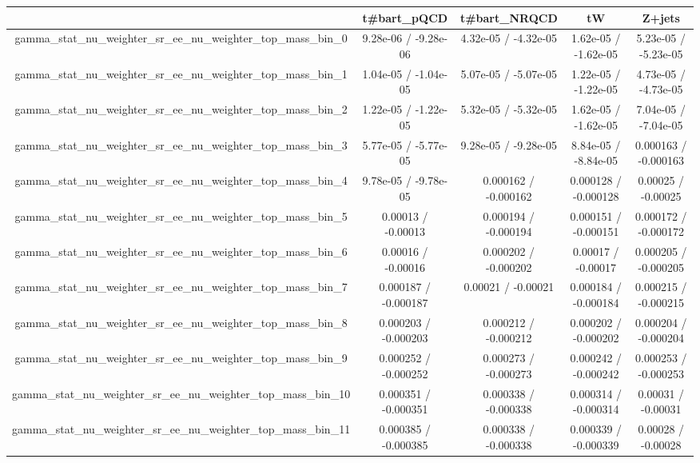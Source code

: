 \documentclass[10pt]{article}
\begin{document}
\begin{table}[htbp]
\begin{center}
\begin{tabular}{|c|c|c|c|c|}
\hline 
      & t#bar{t}_{pQCD}      & t#bar{t}_{NRQCD}      & tW      & Z+jets \\ 
\hline 
  gamma_stat_nu_weighter_sr_ee_nu_weighter_top_mass_bin_0 & 9.28e-06 / -9.28e-06 & 4.32e-05 / -4.32e-05 & 1.62e-05 / -1.62e-05 & 5.23e-05 / -5.23e-05 \\ 
  gamma_stat_nu_weighter_sr_ee_nu_weighter_top_mass_bin_1 & 1.04e-05 / -1.04e-05 & 5.07e-05 / -5.07e-05 & 1.22e-05 / -1.22e-05 & 4.73e-05 / -4.73e-05 \\ 
  gamma_stat_nu_weighter_sr_ee_nu_weighter_top_mass_bin_2 & 1.22e-05 / -1.22e-05 & 5.32e-05 / -5.32e-05 & 1.62e-05 / -1.62e-05 & 7.04e-05 / -7.04e-05 \\ 
  gamma_stat_nu_weighter_sr_ee_nu_weighter_top_mass_bin_3 & 5.77e-05 / -5.77e-05 & 9.28e-05 / -9.28e-05 & 8.84e-05 / -8.84e-05 & 0.000163 / -0.000163 \\ 
  gamma_stat_nu_weighter_sr_ee_nu_weighter_top_mass_bin_4 & 9.78e-05 / -9.78e-05 & 0.000162 / -0.000162 & 0.000128 / -0.000128 & 0.00025 / -0.00025 \\ 
  gamma_stat_nu_weighter_sr_ee_nu_weighter_top_mass_bin_5 & 0.00013 / -0.00013 & 0.000194 / -0.000194 & 0.000151 / -0.000151 & 0.000172 / -0.000172 \\ 
  gamma_stat_nu_weighter_sr_ee_nu_weighter_top_mass_bin_6 & 0.00016 / -0.00016 & 0.000202 / -0.000202 & 0.00017 / -0.00017 & 0.000205 / -0.000205 \\ 
  gamma_stat_nu_weighter_sr_ee_nu_weighter_top_mass_bin_7 & 0.000187 / -0.000187 & 0.00021 / -0.00021 & 0.000184 / -0.000184 & 0.000215 / -0.000215 \\ 
  gamma_stat_nu_weighter_sr_ee_nu_weighter_top_mass_bin_8 & 0.000203 / -0.000203 & 0.000212 / -0.000212 & 0.000202 / -0.000202 & 0.000204 / -0.000204 \\ 
  gamma_stat_nu_weighter_sr_ee_nu_weighter_top_mass_bin_9 & 0.000252 / -0.000252 & 0.000273 / -0.000273 & 0.000242 / -0.000242 & 0.000253 / -0.000253 \\ 
  gamma_stat_nu_weighter_sr_ee_nu_weighter_top_mass_bin_10 & 0.000351 / -0.000351 & 0.000338 / -0.000338 & 0.000314 / -0.000314 & 0.00031 / -0.00031 \\ 
  gamma_stat_nu_weighter_sr_ee_nu_weighter_top_mass_bin_11 & 0.000385 / -0.000385 & 0.000338 / -0.000338 & 0.000339 / -0.000339 & 0.00028 / -0.00028 \\ 

\end{tabular}
\end{center}
\end{table}
\end{document}
